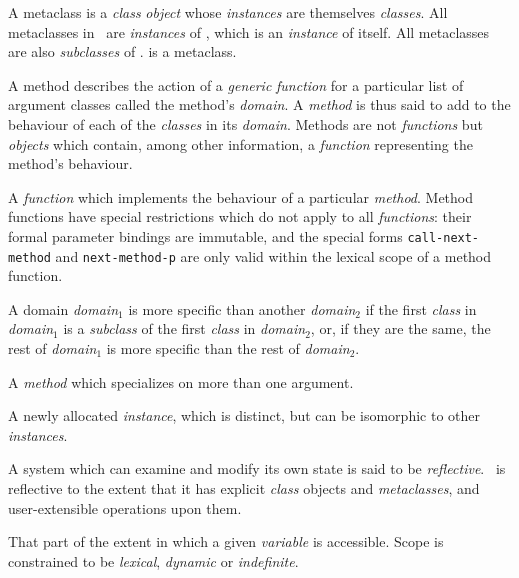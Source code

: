 \begin{optDefinition}
\begin{definitions}
      A metaclass is a {\em
        class} {\em object} whose {\em instances} are themselves {\em classes}.
    All metaclasses in \eulisp\ are {\em instances} of , which
    is an {\em instance} of itself.  All metaclasses are also {\em subclasses}
    of .   is a metaclass.

      A method describes the action of
    a {\em generic} {\em function} for a particular list of argument classes
    called the method's {\em domain}.  A {\em method} is thus said to add to the
    behaviour of each of the {\em classes} in its {\em domain}.  Methods are not
    {\em functions} but {\em objects} which contain, among other information, a
    {\em function} representing the method's behaviour.

      A {\em
        function} which implements the behaviour of a particular {\em method}.
    Method functions have special restrictions which do not apply to all {\em
        functions}: their formal parameter bindings are immutable, and the
    special forms {\tt call-next-method} and {\tt next-method-p} are only valid
    within the lexical scope of a method function.

     
     A domain {\em domain$_1$} is more
    specific than another {\em domain$_2$} if the first {\em class} in {\em
        domain$_1$} is a {\em subclass} of the first {\em class} in {\em
        domain$_2$}, or, if they are the same, the rest of {\em domain$_1$} is
    more specific than the rest of {\em domain$_2$}.

      A {\em method} which
    specializes on more than one argument.

     A newly allocated
    {\em instance}, which is distinct, but can be isomorphic to other {\em
        instances}.

      A system which can
    examine and modify its own state is said to be {\em reflective}.  \eulisp\
    is reflective to the extent that it has explicit {\em class} objects and
    {\em metaclasses}, and user-extensible operations upon them.

     That part of the extent in which a
    given {\em variable} is accessible.  Scope is constrained to be {\em
        lexical}, {\em dynamic} or {\em indefinite}.


\end{definitions}
\end{optDefinition}
